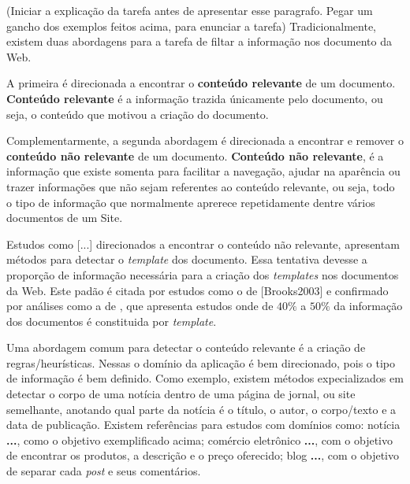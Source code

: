 \documentclass{acm_proc_article-sp}
\newcommand{\remove}[1]{}
\numberwithin{equation}{section}
\begin{document}
\remove{
Retirar uma parcela de informação não relevante desses documentos 
	proporciona benefícios claros.
}

(Iniciar a explicação da tarefa antes de apresentar esse paragrafo.
Pegar um gancho dos exemplos feitos acima, para enunciar a tarefa)
Tradicionalmente, existem duas abordagens para a tarefa de filtar a informação nos 
	documento da Web. 
  \remove{, diminuindo a quantidade de dados não informativos processados.}
A primeira é direcionada a encontrar o {\bf conteúdo relevante} de um 
	documento. {\bf Conteúdo relevante} é a informação trazida únicamente pelo 
	documento, ou seja,
		o conteúdo que motivou a criação do documento.

Complementarmente, a segunda abordagem é direcionada a encontrar e remover o 
	{\bf conteúdo não relevante} de um documento. {\bf Conteúdo não relevante},
	é a informação que existe somenta para facilitar a navegação,
	ajudar na aparência ou trazer informações que não sejam referentes ao 
	conteúdo relevante, ou seja,
		todo o tipo de informação que normalmente aprerece repetidamente 
		dentre vários documentos de um Site.


Estudos como [...] direcionados a encontrar o conteúdo não relevante,
apresentam métodos para detectar o {\it template} dos documento.
	Essa tentativa devesse a proporção de informação necessária para a criação
	dos {\it templates} nos documentos da Web. Este padão é 
	citada por estudos como o de [Brooks2003] e confirmado por análises 
	como a de \cite{Gibson2005}, que apresenta estudos onde de $40\%$ a $50\%$ da 
  informação dos documentos é constituida por {\it template}.


Uma abordagem comum para detectar o conteúdo relevante é a criação de
regras/heurísticas. 
	Nessas 
		o domínio da aplicação é bem direcionado, pois o tipo de informação é 
		bem definido.
		Como exemplo,
			existem métodos expecializados em detectar o corpo de uma notícia 
			dentro de uma página de jornal, ou site semelhante,
			anotando qual parte da notícia é 
				o título,
				o autor, o corpo/texto e
				a data de publicação.
			Existem referências para estudos com domínios como:
				notícia {\bf \cite{}...}, como o objetivo exemplificado acima;
				comércio eletrônico {\bf \cite{}...}, com o objetivo de 
				encontrar os produtos, a descrição e o preço oferecido;
				blog {\bf \cite{}...}, com o objetivo de separar cada 
				{\it post} e seus comentários.


\remove{
Embora estudos como \cite{}... apresentem resutados "interessantes" na detecção de templates, 
}
\end{document}
